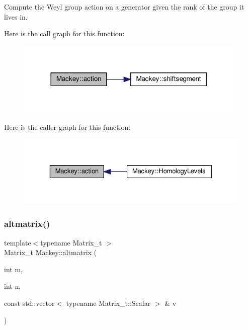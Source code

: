 Compute the Weyl group action on a generator given the rank of the group it lives in. 

Here is the call graph for this function\+:\nopagebreak
\begin{figure}[H]
\begin{center}
\leavevmode
\includegraphics[width=312pt]{namespaceMackey_a3204eaf23b52b27392baaaf0a6898f76_cgraph}
\end{center}
\end{figure}
Here is the caller graph for this function\+:\nopagebreak
\begin{figure}[H]
\begin{center}
\leavevmode
\includegraphics[width=329pt]{namespaceMackey_a3204eaf23b52b27392baaaf0a6898f76_icgraph}
\end{center}
\end{figure}
\mbox{\label{namespaceMackey_a26a529f63caac9c5b4dc809e0e5831be}} 
\subsubsection{\texorpdfstring{altmatrix()}{altmatrix()}}
{\footnotesize\ttfamily template$<$typename Matrix\+\_\+t $>$ \\
Matrix\+\_\+t Mackey\+::altmatrix (\begin{DoxyParamCaption}\item[{int}]{m,  }\item[{int}]{n,  }\item[{const std\+::vector$<$ typename Matrix\+\_\+t\+::\+Scalar $>$ \&}]{v }\end{DoxyParamCaption})}



